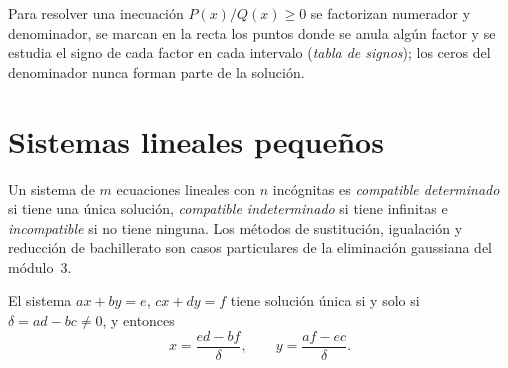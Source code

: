 Para resolver una inecuación $P(x)/Q(x)\ge0$ se factorizan numerador y denominador, se marcan en la recta los puntos donde se anula algún factor y se estudia el signo de cada factor en cada intervalo (\emph{tabla de signos}); los ceros del denominador nunca forman parte de la solución.

\addtocounter{definicion}{1}%

\section{Sistemas lineales pequeños}

Un sistema de $m$ ecuaciones lineales con $n$ incógnitas es \emph{compatible determinado} si tiene una única solución, \emph{compatible indeterminado} si tiene infinitas e \emph{incompatible} si no tiene ninguna. Los métodos de sustitución, igualación y reducción de bachillerato son casos particulares de la eliminación gaussiana del módulo~3.

\begin{teorema}\label{teo:cramer}
El sistema $ax+by=e$, $cx+dy=f$ tiene solución única si y solo si $\delta=ad-bc\neq0$, y entonces
\[
x=\frac{ed-bf}{\delta},\qquad y=\frac{af-ec}{\delta}.
\]
\end{teorema}

\addtocounter{definicion}{1}%

\addtocounter{definicion}{1}%

\addtocounter{definicion}{1}%


